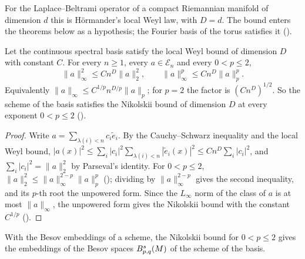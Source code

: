 For the Laplace--Beltrami operator of a compact Riemannian manifold of dimension $d$ this is
H\"ormander's local Weyl law, with $D = d$. The bound enters the theorems below as a
hypothesis; the Fourier basis of the torus satisfies it ().

\begin{theorem}
\label{thm:local-weyl-nikolskii}
\leanok
{}
Let the continuous spectral basis satisfy the local Weyl bound of dimension $D$ with constant
$C$. For every $n \geq 1$, every $a \in \mathcal{E}_n$ and every $0 < p \leq 2$,
\[
  \|a\|_\infty^2 \leq C n^D \|a\|_2^2 ,
  \qquad
  \|a\|_\infty^p \leq C n^D \|a\|_p^p .
\]
Equivalently $\|a\|_\infty \leq C^{1/p} n^{D/p} \|a\|_p$; for $p = 2$ the factor is
$(C n^D)^{1/2}$. So the scheme of the basis satisfies the Nikolskii bound of dimension $D$ at
every exponent $0 < p \leq 2$ ().
\end{theorem}

\begin{proof}
\leanok
{}
Write $a = \sum_{\lambda(i) < n} c_i \tilde e_i$. By the Cauchy--Schwarz inequality and the local
Weyl bound, $|a(x)|^2 \leq \sum_i |c_i|^2 \sum_{\lambda(i) < n} |\tilde e_i(x)|^2 \leq C n^D
\sum_i |c_i|^2$, and $\sum_i |c_i|^2 = \|a\|_2^2$ by Parseval's identity. For $0 < p \leq 2$,
$\|a\|_2^2 \leq \|a\|_\infty^{2-p} \|a\|_p^p$ (); dividing by
$\|a\|_\infty^{2-p}$ gives the second inequality, and its $p$-th root the unpowered form. Since
the $L_\infty$ norm of the class of $a$ is at most $\|a\|_\infty$, the unpowered form gives the
Nikolskii bound with the constant $C^{1/p}$ ().
\end{proof}

With the Besov embeddings of a scheme, the Nikolskii bound for $0 < p \leq 2$ gives the
embeddings of the Besov spaces $B^{s}_{p,q}(M)$ of the scheme of the basis.

